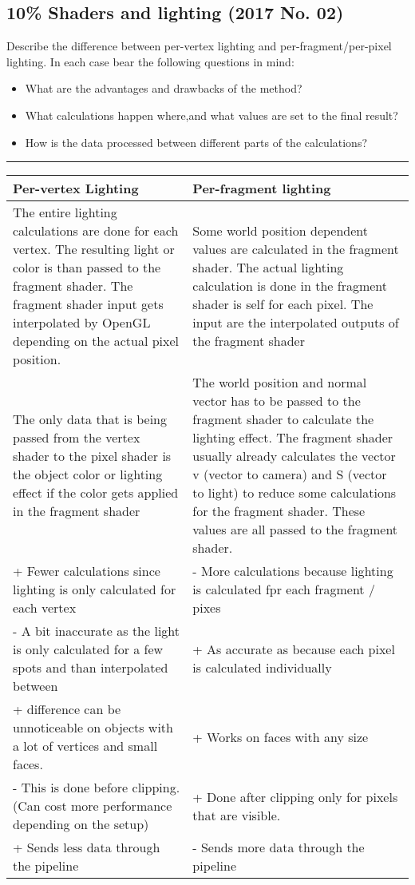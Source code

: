 \subsection{10\% Shaders and lighting (2017 No. 02)}
Describe the difference between per-vertex lighting and per-fragment/per-pixel lighting. In each case bear the following questions in mind:

\begin{itemize}
    \item What are the advantages and drawbacks of the method?
    \item What calculations happen where,and what values are set to the final result?
    \item How is the data processed between different parts of the calculations?
\end{itemize}

\rule{\linewidth}{0.1mm}

\begin{tabularx}{\textwidth}{| X | X |}
    \hline
    \textbf{Per-vertex Lighting} & \textbf{Per-fragment lighting} \\ \hline
    The entire lighting calculations are done for each vertex. The resulting light or color is than passed to the fragment shader. The fragment shader input gets interpolated by OpenGL depending on the actual pixel position. & Some world position dependent values are calculated in the fragment shader. The actual lighting calculation is done in the fragment shader is self for each pixel. The input are the interpolated outputs of the fragment shader\\ \hline

    The only data that is being passed from the vertex shader to the pixel shader is the object color or lighting effect if the color gets applied in the fragment shader & The world position and normal vector has to be passed to the fragment shader to calculate the lighting effect. The fragment shader usually already calculates the vector v (vector to camera) and S (vector to light) to reduce some calculations for the fragment shader. These values are all passed to the fragment shader.\\
    \hline

    + Fewer calculations since lighting is only calculated for each vertex & - More calculations because lighting is calculated fpr each fragment / pixes \\
    - A bit inaccurate as the light is only calculated for a few spots and than interpolated between & + As accurate as because each pixel is calculated individually \\
    + difference can be unnoticeable on objects with a lot of vertices and small faces. & + Works on faces with any size \\
    - This is done before clipping. (Can cost more performance depending on the setup) & + Done after clipping only for pixels that are visible. \\
    + Sends less data through the pipeline & - Sends more data through the pipeline \\

    \hline


\end{tabularx}